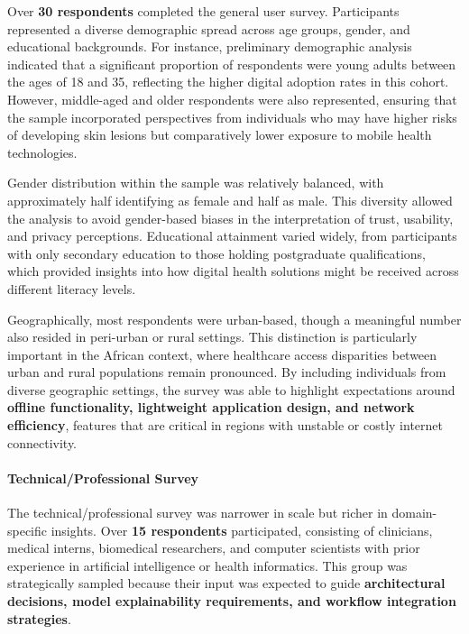 \documentclass[
  12pt,
  oneside]{article}
\begin{document}
Over \textbf{30 respondents} completed the general user survey.
Participants represented a diverse demographic spread across age groups,
gender, and educational backgrounds. For instance, preliminary
demographic analysis indicated that a significant proportion of
respondents were young adults between the ages of 18 and 35, reflecting
the higher digital adoption rates in this cohort. However, middle-aged
and older respondents were also represented, ensuring that the sample
incorporated perspectives from individuals who may have higher risks of
developing skin lesions but comparatively lower exposure to mobile
health technologies.

Gender distribution within the sample was relatively balanced, with
approximately half identifying as female and half as male. This
diversity allowed the analysis to avoid gender-based biases in the
interpretation of trust, usability, and privacy perceptions. Educational
attainment varied widely, from participants with only secondary
education to those holding postgraduate qualifications, which provided
insights into how digital health solutions might be received across
different literacy levels.

Geographically, most respondents were urban-based, though a meaningful
number also resided in peri-urban or rural settings. This distinction is
particularly important in the African context, where healthcare access
disparities between urban and rural populations remain pronounced. By
including individuals from diverse geographic settings, the survey was
able to highlight expectations around \textbf{offline functionality,
lightweight application design, and network efficiency}, features that
are critical in regions with unstable or costly internet connectivity.

\paragraph{Technical/Professional
Survey}\label{technicalprofessional-survey}

The technical/professional survey was narrower in scale but richer in
domain-specific insights. Over \textbf{15 respondents} participated,
consisting of clinicians, medical interns, biomedical researchers, and
computer scientists with prior experience in artificial intelligence or
health informatics. This group was strategically sampled because their
input was expected to guide \textbf{architectural decisions, model
explainability requirements, and workflow integration strategies}.
\end{document}
